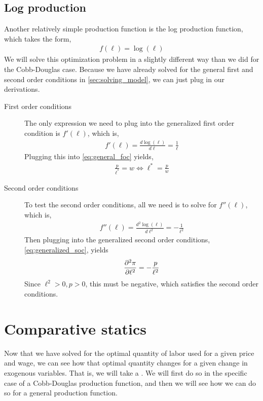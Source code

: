 \subsection{Log production}
Another relatively simple production function is the log production function, which takes the form,
\begin{align}
    f(\ell) = \log(\ell)
\end{align}
We will solve this optimization problem in a slightly different way than we did for the Cobb-Douglas case. Because we have already solved for the general first and second order conditions in \ref{sec:solving_model}, we can just plug in our derivations.
\begin{description}
    \item[First order conditions] The only expression we need to plug into the generalized first order condition is $f'(\ell)$, which is,
    \begin{align*}
        f'(\ell) = \frac{d \log(\ell)}{d\ell} = \frac{1}{\ell}
    \end{align*} 
    Plugging this into \ref{eq:general_foc} yields,
    \begin{align*}
        \frac{p}{\ell^*} = w \iff \ell^* = \frac{p}{w}
    \end{align*}
    \item[Second order conditions] To test the second order conditions, all we need is to solve for $f''(\ell)$, which is,
    \begin{align*}
        f''(\ell) = \frac{d^2 \log(\ell)}{d \ell^2} = - \frac{1}{\ell^2}
    \end{align*}  
    Then plugging into the generalized second order conditions, \ref{eq:generalized_soc}, yields
    \begin{align}
        \frac{\partial ^2 \pi}{\partial \ell^2} = - \frac{p}{\ell^2}
    \end{align}
    Since $\ell^2 > 0, p > 0$, this must be negative, which satisfies the second order conditions. 
\end{description}

\section{Comparative statics}
Now that we have solved for the optimal quantity of labor used for a given price and wage, we can see how that optimal quantity changes for a given change in exogenous variables. That is, we will take a . We will first do so in the specific case of a Cobb-Douglas production function, and then we will see how we can do so for a general production function. 

